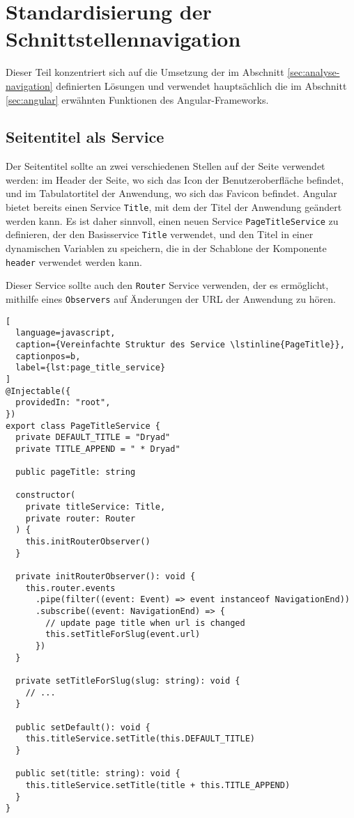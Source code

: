 \section{Standardisierung der Schnittstellennavigation}

Dieser Teil konzentriert sich auf die Umsetzung der im Abschnitt \ref{sec:analyse-navigation} definierten Lösungen und verwendet hauptsächlich die im Abschnitt \ref{sec:angular} erwähnten Funktionen des Angular-Frameworks.

\subsection{Seitentitel als Service}

Der Seitentitel sollte an zwei verschiedenen Stellen auf der Seite verwendet werden: im Header der Seite, wo sich das Icon der Benutzeroberfläche befindet, und im Tabulatortitel der Anwendung, wo sich das Favicon befindet.
Angular bietet bereits einen Service \lstinline{Title}, mit dem der Titel der Anwendung geändert werden kann.
Es ist daher sinnvoll, einen neuen Service \lstinline{PageTitleService} zu definieren, der den Basisservice \lstinline{Title} verwendet, und den Titel in einer dynamischen Variablen zu speichern, die in der Schablone der Komponente \lstinline{header} verwendet werden kann.

Dieser Service sollte auch den \lstinline{Router} Service verwenden, der es ermöglicht, mithilfe eines \lstinline{Observers} auf Änderungen der URL der Anwendung zu hören.
\begin{lstlisting}[
  language=javascript,
  caption={Vereinfachte Struktur des Service \lstinline{PageTitle}},
  captionpos=b,
  label={lst:page_title_service}
]
@Injectable({
  providedIn: "root",
})
export class PageTitleService {
  private DEFAULT_TITLE = "Dryad"
  private TITLE_APPEND = " * Dryad"

  public pageTitle: string

  constructor(
    private titleService: Title,
    private router: Router
  ) {
    this.initRouterObserver()
  }

  private initRouterObserver(): void {
    this.router.events
      .pipe(filter((event: Event) => event instanceof NavigationEnd))
      .subscribe((event: NavigationEnd) => {
        // update page title when url is changed
        this.setTitleForSlug(event.url)
      })
  }

  private setTitleForSlug(slug: string): void {
    // ...
  }

  public setDefault(): void {
    this.titleService.setTitle(this.DEFAULT_TITLE)
  }

  public set(title: string): void {
    this.titleService.setTitle(title + this.TITLE_APPEND)
  }
}
\end{lstlisting}

